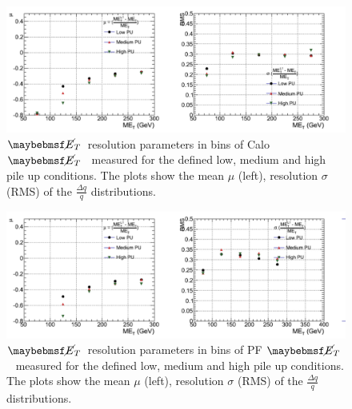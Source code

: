 \begin{figure}[h!]
  \vspace{20pt}
        \centering
        \includegraphics[width=1.0\textwidth]{plots/res_CaloMET_summary.pdf}
        \caption[$\met$~resolution parameters in bins of Calo $\met$~ measured for the defined low, medium and high pile up conditions.]{$\met$~resolution parameters in bins of Calo $\met$~ measured for the defined low, medium and high pile up conditions. The plots show the mean $\mu$ (left), resolution $\sigma$ (RMS) of the $\frac{\Delta q}{q}$  distributions.}
        \label{fig:calometresultspu}
\end{figure}
\begin{figure}[h!]
  \vspace{20pt}
        \centering
        \includegraphics[width=1.0\textwidth]{plots/res_pfMET_summary.pdf}
        \caption[$\met$~resolution parameters in bins of PF $\met$~ measured for the defined low, medium and high pile up conditions.]{$\met$~resolution parameters in bins of PF $\met$~ measured for the defined low, medium and high pile up conditions. The plots show the mean $\mu$ (left), resolution $\sigma$ (RMS) of the $\frac{\Delta q}{q}$  distributions.}
        \label{fig:pfmetresultspu}
\end{figure}



